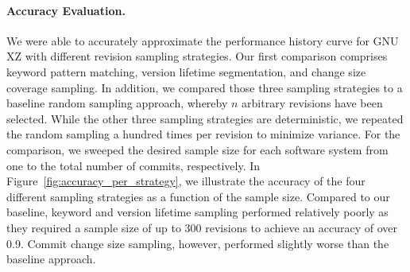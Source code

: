 \paragraph{Accuracy Evaluation.} We were able to accurately approximate the
performance history curve for GNU XZ with different revision sampling strategies. Our first comparison comprises
keyword pattern matching, version lifetime segmentation, and change size
coverage sampling. In addition, we compared those three sampling strategies to
a baseline random sampling approach, whereby $n$ arbitrary revisions have been
selected. While the other three sampling strategies are deterministic, we
repeated the random sampling a hundred times per revision to minimize variance.
For the comparison, we sweeped the desired sample size for each software system
from one to the total number of commits, respectively. In
Figure~\ref{fig:accuracy_per_strategy}, we illustrate the accuracy of the four
different sampling strategies as a function of the sample size. Compared to our
baseline, keyword and version lifetime sampling performed relatively poorly as
they required a sample size of up to 300 revisions to achieve an accuracy of
over 0.9. Commit change size sampling, however, performed slightly worse than
the baseline approach.

